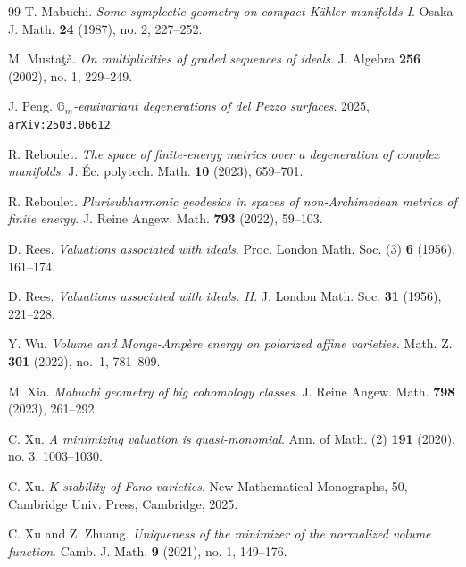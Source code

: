 \documentclass[11pt, leqno]{amsart}%
\theoremstyle{plain}
\theoremstyle{definition}
\theoremstyle{remark}
\numberwithin{equation}{section}
\begin{document}
\begin{thebibliography}{99}
     T. Mabuchi. \emph{Some symplectic geometry on compact Kähler manifolds I}.
    Osaka J. Math. \textbf{24} (1987), no. 2, 227–252.
	
     M. Musta\c{t}\v{a}. \emph{On multiplicities of graded sequences of ideals}.
    J. Algebra \textbf{256} (2002), no. 1, 229--249.

     J. Peng. \emph{$\mathbb{G}_m$-equivariant degenerations of del Pezzo surfaces}.
    2025, \texttt{arXiv:2503.06612}.
	
     R. Reboulet. \emph{The space of finite-energy metrics over a degeneration of complex manifolds}. 
    J. Éc. polytech. Math. \textbf{10} (2023), 659–701.

     R. Reboulet. \emph{Plurisubharmonic geodesics in spaces of non-Archimedean metrics of finite energy}. 
    J. Reine Angew. Math. {\bf 793} (2022), 59--103.

     D. Rees. \emph{Valuations associated with ideals}. 
    Proc. London Math. Soc. (3) {\bf 6} (1956), 161--174.

     D. Rees. \emph{Valuations associated with ideals. II}. 
    J. London Math. Soc. {\bf 31} (1956), 221--228.
	

     Y. Wu. \emph{Volume and Monge-Amp\`ere energy on polarized affine varieties}.
    Math. Z. {\bf 301} (2022), no.~1, 781--809.
	
     M. Xia. \emph{Mabuchi geometry of big cohomology classes}. 
    J. Reine Angew. Math. {\bf 798} (2023), 261--292.
	
     C. Xu. \emph{A minimizing valuation is quasi-monomial}. 
    Ann. of Math. (2) \textbf{191} (2020), no. 3, 1003--1030.

     C. Xu. \emph{K-stability of Fano varieties}.
    New Mathematical Monographs, 50, Cambridge Univ. Press, Cambridge, 2025.
    
     C. Xu and Z. Zhuang. \emph{Uniqueness of the minimizer of the normalized volume function}.  
    Camb. J. Math. \textbf{9} (2021), no. 1, 149–176.
	


\end{thebibliography}
\end{document}
